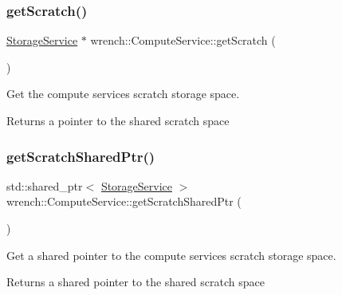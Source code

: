 \subsubsection{\texorpdfstring{get\+Scratch()}{getScratch()}}
{\footnotesize\ttfamily \hyperlink{classwrench_1_1_storage_service}{Storage\+Service} $\ast$ wrench\+::\+Compute\+Service\+::get\+Scratch (\begin{DoxyParamCaption}{ }\end{DoxyParamCaption})\hspace{0.3cm}{\ttfamily [protected]}}



Get the compute service\textquotesingle{}s scratch storage space. 

\begin{DoxyReturn}{Returns}
a pointer to the shared scratch space 
\end{DoxyReturn}
\mbox{\label{classwrench_1_1_compute_service_a6532846cd02094b6095341d37d5b2bf7}} 
\subsubsection{\texorpdfstring{get\+Scratch\+Shared\+Ptr()}{getScratchSharedPtr()}}
{\footnotesize\ttfamily std\+::shared\+\_\+ptr$<$ \hyperlink{classwrench_1_1_storage_service}{Storage\+Service} $>$ wrench\+::\+Compute\+Service\+::get\+Scratch\+Shared\+Ptr (\begin{DoxyParamCaption}{ }\end{DoxyParamCaption})\hspace{0.3cm}{\ttfamily [protected]}}



Get a shared pointer to the compute service\textquotesingle{}s scratch storage space. 

\begin{DoxyReturn}{Returns}
a shared pointer to the shared scratch space 
\end{DoxyReturn}
\mbox{\label{classwrench_1_1_compute_service_a5d2e4bca8b531521561f167769186f56}} 
